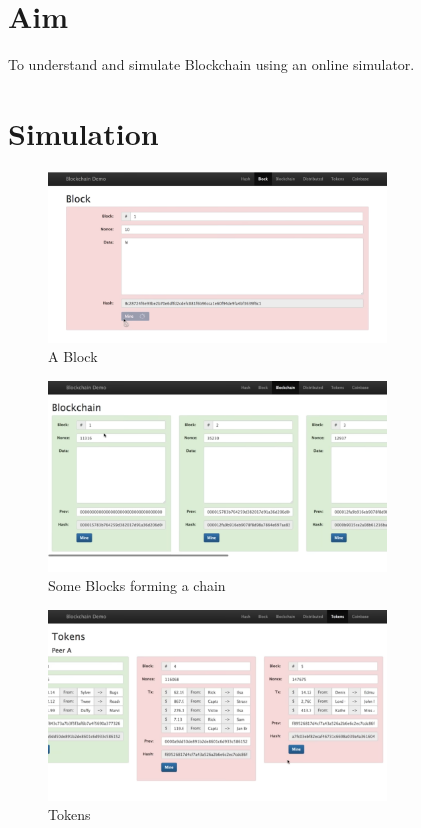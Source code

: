 \documentclass[11pt]{article}
\begin{document}
\tableofcontents
\thispagestyle{empty}
\clearpage

\setcounter{page}{1}

\section{Aim}
To understand and simulate Blockchain using an online simulator.


\section{Simulation}

\begin{figure}[H]
    \centering
    \includegraphics[width=0.8\textwidth]{1.png}
    \caption{A Block}
    \label{fig:1}
\end{figure}

\begin{figure}[H]
    \centering
    \includegraphics[width=0.8\textwidth]{2.png}
    \caption{Some Blocks forming a chain}
    \label{fig:1}
\end{figure}

\begin{figure}[H]
    \centering
    \includegraphics[width=0.8\textwidth]{3.png}
    \caption{Tokens}
    \label{fig:1}
\end{figure}
\end{document}
